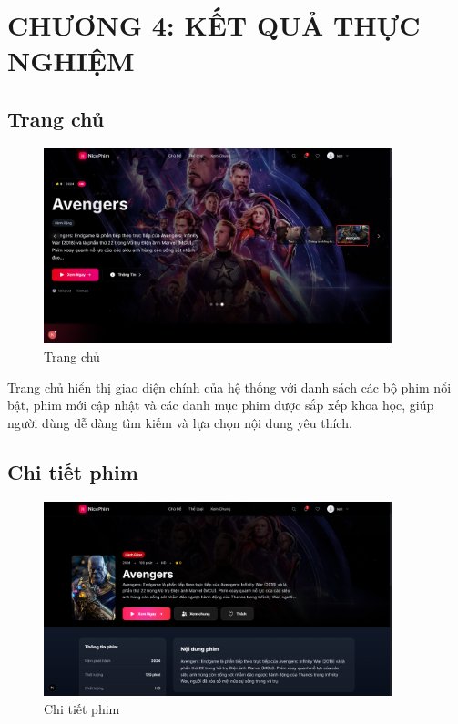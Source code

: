 \newpage
\section{\textbf{CHƯƠNG 4: KẾT QUẢ THỰC NGHIỆM}}

\subsection{Trang chủ}
\begin{figure}[H]
	\centering
	\includegraphics[width=0.9\textwidth]{image/demo/trangchu.png}
	\caption{Trang chủ}
\end{figure}

Trang chủ hiển thị giao diện chính của hệ thống với danh sách các bộ phim nổi bật, phim mới cập nhật và các danh mục phim được sắp xếp khoa học, giúp người dùng dễ dàng tìm kiếm và lựa chọn nội dung yêu thích.


\subsection{Chi tiết phim}
\begin{figure}[H]
	\centering
	\includegraphics[width=0.9\textwidth]{image/demo/chitiet.png}
	\caption{Chi tiết phim}
\end{figure}

